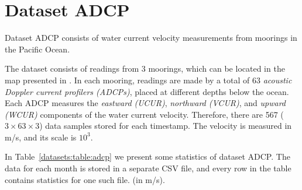 
\vspace{-20pt}
\section{Dataset ADCP}
\label{datasets:adcp}


\vspace{-5pt}
Dataset ADCP \cite{dataset:sst1} consists of water current velocity measurements from moorings in the Pacific Ocean. \TAODef


The dataset consists of readings from 3 moorings, which can be located in the map presented in \cite{dataset:sst1}. In each mooring, readings are made by a total of 63 \textit{acoustic Doppler current profilers (ADCPs)}, placed at different depths below the ocean. Each ADCP measures the \textit{eastward (UCUR)}, \textit{northward (VCUR)}, and \textit{upward (WCUR)} components of the water current velocity. Therefore, there are 567 ($3\times63\times3$) data samples stored for each timestamp. The velocity is measured in m/s, and its scale is $10^3$.


In Table~\ref{datasets:table:adcp} we present some statistics of dataset ADCP. The data for each month is stored in a separate CSV file, and every row in the table contains statistics for one such file. \commonTable (in m/s).




